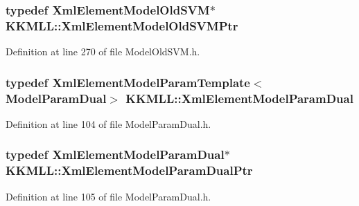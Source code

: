 \subsubsection[{\texorpdfstring{Xml\+Element\+Model\+Old\+S\+V\+M\+Ptr}{XmlElementModelOldSVMPtr}}]{\setlength{\rightskip}{0pt plus 5cm}typedef {\bf Xml\+Element\+Model\+Old\+S\+VM}$\ast$ {\bf K\+K\+M\+L\+L\+::\+Xml\+Element\+Model\+Old\+S\+V\+M\+Ptr}}\hypertarget{namespace_k_k_m_l_l_a2301fd1414d0b02519f75bcde935a31a}{}\label{namespace_k_k_m_l_l_a2301fd1414d0b02519f75bcde935a31a}


Definition at line 270 of file Model\+Old\+S\+V\+M.\+h.

\subsubsection[{\texorpdfstring{Xml\+Element\+Model\+Param\+Dual}{XmlElementModelParamDual}}]{\setlength{\rightskip}{0pt plus 5cm}typedef {\bf Xml\+Element\+Model\+Param\+Template}$<${\bf Model\+Param\+Dual}$>$ {\bf K\+K\+M\+L\+L\+::\+Xml\+Element\+Model\+Param\+Dual}}\hypertarget{namespace_k_k_m_l_l_a2cb7719542d14dbf06bd95dda1cf6001}{}\label{namespace_k_k_m_l_l_a2cb7719542d14dbf06bd95dda1cf6001}


Definition at line 104 of file Model\+Param\+Dual.\+h.

\subsubsection[{\texorpdfstring{Xml\+Element\+Model\+Param\+Dual\+Ptr}{XmlElementModelParamDualPtr}}]{\setlength{\rightskip}{0pt plus 5cm}typedef {\bf Xml\+Element\+Model\+Param\+Dual}$\ast$ {\bf K\+K\+M\+L\+L\+::\+Xml\+Element\+Model\+Param\+Dual\+Ptr}}\hypertarget{namespace_k_k_m_l_l_ab568fdebc9ddf8cf2e4bb6c613a31576}{}\label{namespace_k_k_m_l_l_ab568fdebc9ddf8cf2e4bb6c613a31576}


Definition at line 105 of file Model\+Param\+Dual.\+h.

